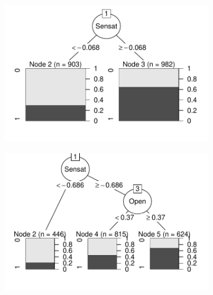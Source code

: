 \begin{figure}[H]
	\centering
		\begin{subfigure}[t]{.49\textwidth}
		\centering
		\captionsetup{justification=centering}
		\includegraphics[width=\linewidth, trim=0 20 0 0, clip]{MO_M1.pdf}
		\caption{}
	\end{subfigure}
	\begin{subfigure}[t]{.49\textwidth}
		\centering
		\captionsetup{justification=centering}
		\includegraphics[width=\linewidth, trim=0 20 0 0, clip]{MO_M2.pdf}
		\caption{}
	\end{subfigure}
\newline
\begin{subfigure}[t]{.49\textwidth}
	\centering
	\captionsetup{justification=centering}

\end{subfigure}
\end{figure}
